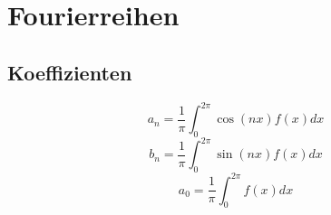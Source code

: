 \section{Fourierreihen}
\subsection{Koeffizienten}
\[ \boxed{a_n = \frac{1}{\pi} \int_0^{2 \pi} \cos(nx) f(x) dx} \]
\[ \boxed{b_n = \frac{1}{\pi} \int_0^{2 \pi} \sin(nx) f(x) dx} \]
\[ \boxed{a_0 = \frac{1}{\pi} \int_0^{2 \pi} f(x) dx
} \]